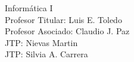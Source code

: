 \thispagestyle{empty}

\Large{Informática I}\\

\noindent Profesor Titular: Luis E. Toledo\\
Profesor Asociado: Claudio J. Paz\\

\medskip
\noindent JTP: Nievas Martin\\
JTP: Silvia A. Carrera

